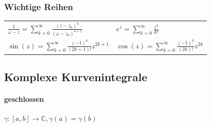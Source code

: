 \begin{sectionbox}
    \subsubsection{Wichtige Reihen}
    \begin{tabular}{ll}
        \(\displaystyle \frac{1}{\omega - z} =  \sum_{k=0}^\infty \frac{(z-z_0)^k}{(\omega-z_0)^{k+1}}\) & \(\displaystyle e^z=\sum_{k=0}^\infty \frac{z^k}{k!} \)                  \\
        \(\displaystyle \sin(z) = \sum_{k=0}^\infty \frac{(-1)^k}{(2k+1)!}z^{2k+1} \)                    & \(\displaystyle \cos(z) = \sum_{k=0}^\infty\frac{(-1)^k}{(2k)!}z^{2k} \)
    \end{tabular}
\end{sectionbox}


\subsection{Komplexe Kurvenintegrale}
\paragraph{geschlossen} $\gamma:[a,b]\rightarrow\mathbb C, \gamma(a)=\gamma(b)$
